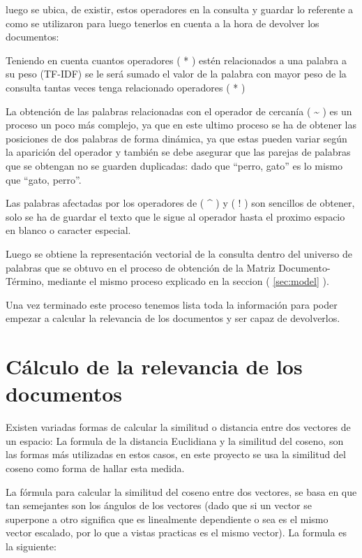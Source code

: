 \documentclass[10pt]{article}
\begin{document}
luego se ubica, de existir, estos operadores en la consulta y guardar lo referente a como se utilizaron para luego tenerlos en cuenta a la hora de devolver los documentos:

Teniendo en cuenta cuantos operadores ( * ) estén relacionados a una palabra a su peso (TF-IDF) se le será sumado el valor de la palabra con mayor peso de la consulta tantas veces tenga relacionado operadores ( * ) 

La obtención de las palabras relacionadas con el operador de cercanía ( \textasciitilde{} ) es un proceso un poco más complejo, ya que en este ultimo proceso se ha de obtener las posiciones de dos palabras de forma dinámica, ya que estas pueden variar según la aparición del operador y también se debe asegurar que las parejas de palabras que se obtengan no se guarden duplicadas: dado que “perro, gato” es lo mismo que “gato, perro”.

Las palabras afectadas por los operadores de ( \textasciicircum{} ) y ( ! )  son sencillos de obtener, solo se ha de guardar el texto que le sigue al operador hasta el proximo espacio en blanco o caracter especial.

Luego se obtiene la representación vectorial de la consulta dentro del universo de palabras que se obtuvo en el proceso de obtención de la Matriz Documento-Término, mediante el mismo proceso explicado en la seccion ( \ref{sec:model} ).

Una vez terminado este proceso tenemos lista toda la información para poder empezar a calcular la relevancia de los documentos y ser capaz de devolverlos.

\section{Cálculo de la relevancia de los documentos}
\label{sec:doc-relevancy}

Existen variadas formas de calcular la similitud o distancia entre dos vectores de un espacio: La formula de la distancia Euclidiana y la similitud del coseno, son las formas más utilizadas en estos casos, en este proyecto se usa la similitud del coseno como forma de hallar esta medida.

La fórmula para calcular la similitud del coseno entre dos vectores, se basa en que tan semejantes son los ángulos de los vectores (dado que si un vector se superpone a otro significa que es linealmente dependiente o sea es el mismo vector escalado, por lo que a vistas practicas es el mismo vector). La formula es la siguiente:
\end{document}
